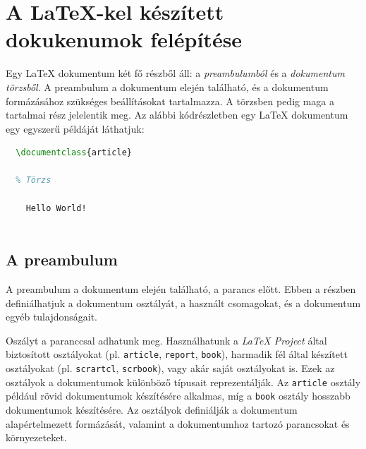 \section{A \LaTeX{}-kel készített dokukenumok felépítése}

Egy \LaTeX{} dokumentum két fő részből áll: a \textit{preambulumból} és a
\textit{dokumentum törzsből}. A preambulum a dokumentum elején található, és a
dokumentum formázásához szükséges beállításokat tartalmazza. A törzsben pedig
maga a tartalmai rész jelelentik meg. Az alábbi kódrészletben egy \LaTeX{}
dokumentum egy egyszerű példáját láthatjuk:

\begin{lstlisting}[caption={\LaTeX{} mintaprogram},language=tex]
  % Preambulum
  \documentclass{article}

  % Törzs
  
    Hello World!
  
\end{lstlisting}


\subsection{A preambulum}

A preambulum a dokumentum elején található, a
parancs előtt. Ebben a részben definiálhatjuk a dokumentum osztályát, a használt
csomagokat, és a dokumentum egyéb tulajdonságait.

Oszályt a
paranccsal adhatunk meg. Használhatunk a \textit{\LaTeX{} Project} által
biztosított osztályokat (pl. \texttt{article}, \texttt{report}, \texttt{book}),
harmadik fél által készített osztályokat (pl. \texttt{scrartcl},
\texttt{scrbook}), vagy akár saját osztályokat is. Ezek az osztályok a
dokumentumok különböző típusait reprezentálják. Az \texttt{article} osztály
például rövid dokumentumok készítésére alkalmas, míg a \texttt{book} osztály
hosszabb dokumentumok készítésére. Az osztályok definiálják a dokumentum
alapértelmezett formázását, valamint a dokumentumhoz tartozó parancsokat és
környezeteket. \cite{latex_project}

